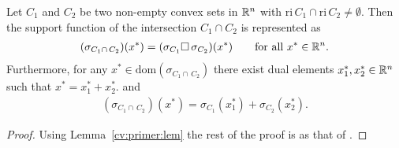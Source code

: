 \begin{theorem*}
  Let $C_1$ and $C_2$ be two non-empty convex sets in $\mathbb{R}^n$ with
  $\mathrm{ri}\,C_1\cap\mathrm{ri}\,C_2\neq\emptyset.$
  Then the support function of the intersection 
  $
    C_1\! \cap C_2
  $
  is represented as
  \begin{gather}
    (\sigma_{
    C_1 \cap\, C_2
    })
    (x^*)
    =
    (\sigma_{C_1}\square \,\sigma_{C_2})
    (x^*)
    \qquad
    \text{for all}\ 
    x^* \in \R^n.
  \end{gather}
  Furthermore, for any
  $
  x^*\in \mathrm{dom}
    (\sigma_{
    C_1 \cap\, C_2
    })
  $
  there exist dual elements 
  $
    x_1^*
    ,
    x_2^*
    \in \mathbb{R}^n
  $ 
  such that 
  $
    x^*
    =
    x_1^*
    +
    x_2^*.
  $
  and
  \begin{gather}
    (\sigma_{
    C_1 \cap\, C_2
    })
    (x^*)
    =
    \sigma_{C_1}(x_1^*)
    +
    \sigma_{C_2}(x_2^*).
  \end{gather}
\end{theorem*}
\begin{proof}
  Using Lemma~\ref{cv:primer:lem}
  the rest of the proof is as that of
  \emph{\cite[Theorem~4.23(b)]{Mordukhovich2022}}.
\end{proof}

